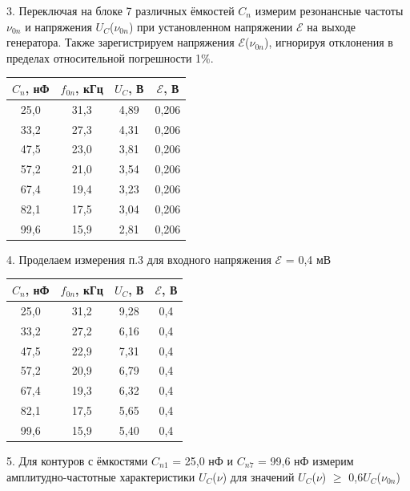 \documentclass[a4paper,12pt]{article}
\begin{document}
3. Переключая на блоке 7 различных ёмкостей $C_n$ измерим резонансные частоты $\nu_{0n}$ и напряжения $U_C$($\nu_{0n}$) при установленном напряжении $\mathcal{E}$ на выходе генератора. Также зарегистрируем напряжения $\mathcal{E}$($\nu_{0n}$), игнорируя отклонения в пределах относительной погрешности 1\%. 

\begin{tabular}{|c|c|c|c|}
\hline
$C_n$, нФ & $f_{0n}$, кГц & $U_C$, В & $\mathcal{E}$, В \\
\hline
25,0 & 31,3 & 4,89 & 0,206 \\
33,2 & 27,3 & 4,31 & 0,206 \\
47,5 & 23,0 & 3,81 & 0,206 \\
57,2 & 21,0 & 3,54 & 0,206 \\
67,4 & 19,4 & 3,23 & 0,206 \\
82,1 & 17,5 & 3,04 & 0,206 \\
99,6 & 15,9 & 2,81 & 0,206 \\
\hline
\end{tabular}

4. Проделаем измерения п.3 для входного напряжения $\mathcal{E}$ = 0,4 мВ 

\begin{tabular}{|c|c|c|c|}
\hline
$C_n$, нФ & $f_{0n}$, кГц & $U_C$, В & $\mathcal{E}$, В \\
\hline
25,0 & 31,2 & 9,28 & 0,4 \\
33,2 & 27,2 & 6,16 & 0,4 \\
47,5 & 22,9 & 7,31 & 0,4 \\
57,2 & 20,9 & 6,79 & 0,4 \\
67,4 & 19,3 & 6,32 & 0,4 \\
82,1 & 17,5 & 5,65 & 0,4 \\
99,6 & 15,9 & 5,40 & 0,4 \\
\hline
\end{tabular}

5. Для контуров с ёмкостями $C_{n1}$ = 25,0 нФ и $C_{n7}$ = 99,6 нФ измерим амплитудно-частотные характеристики $U_C$($\nu$) для значений $U_C$($\nu$) $\geq$ 0,6$U_C$($\nu_{0n}$) 
\end{document}
